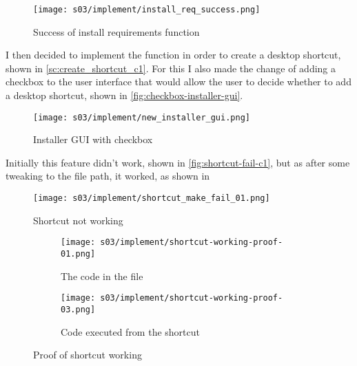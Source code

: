     \begin{figure}[!ht]
        \centering
        \texttt{[image: s03/implement/install\_req\_success.png]}
        \caption{Success of install requirements function}
        \label{fig:install-req-success}
    \end{figure}

    I then decided to implement the function in order to create a desktop shortcut, shown in \autoref{sc:create_shortcut_c1}. 
    For this I also made the change of adding a checkbox to the user interface that would allow the user to decide whether to add a desktop shortcut, shown in \autoref{fig:checkbox-installer-gui}. 


    \begin{figure}[!ht]
        \centering
        \texttt{[image: s03/implement/new\_installer\_gui.png]}
        \caption{Installer GUI with checkbox}
        \label{fig:checkbox-installer-gui}
    \end{figure}

    Initially this feature didn't work, shown in \autoref{fig:shortcut-fail-c1}, but as after some tweaking to the file path, it worked, as shown in 

    \begin{figure}[!ht]
        \centering
        \texttt{[image: s03/implement/shortcut\_make\_fail\_01.png]}
        \caption{Shortcut not working}
        \label{fig:shortcut-fail-c1}
    \end{figure}

    \begin{figure}[!ht]
        \centering
        \begin{subfigure}{.4\textwidth}
            \centering
            \texttt{[image: s03/implement/shortcut-working-proof-01.png]}
            \caption{The code in the file}
            \label{fig:sc-working-proof-1-c1}
        \end{subfigure}%
        \begin{subfigure}{.4\textwidth}
            \centering
            \texttt{[image: s03/implement/shortcut-working-proof-03.png]}
            \caption{Code executed from the shortcut}
            \label{fig:}
        \end{subfigure}%
        \caption{Proof of shortcut working}
    \end{figure}


